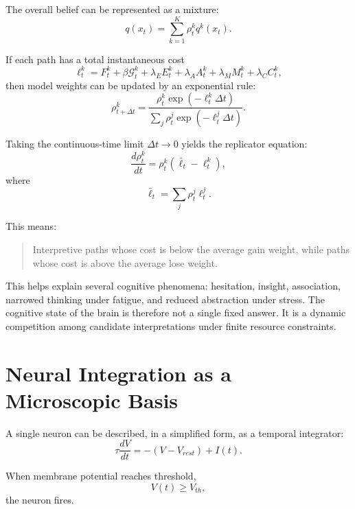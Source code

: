 \documentclass[11pt, a4paper]{article}
\begin{document}
The overall belief can be represented as a mixture:
\begin{equation}
q(x_t)
=
\sum_{k=1}^{K}
\rho_t^k q^k(x_t).
\end{equation}

If each path has a total instantaneous cost
\begin{equation}
\ell_t^k
=
F_t^k
+
\beta \mathcal{G}_t^k
+
\lambda_E E_t^k
+
\lambda_A A_t^k
+
\lambda_M M_t^k
+
\lambda_C C_t^k,
\end{equation}
then model weights can be updated by an exponential rule:
\begin{equation}
\rho_{t+\Delta t}^k
=
\frac{
\rho_t^k
\exp(-\ell_t^k \Delta t)
}{
\sum_j
\rho_t^j
\exp(-\ell_t^j \Delta t)
}.
\end{equation}

Taking the continuous-time limit $\Delta t \to 0$ yields the replicator equation:
\begin{equation}
\frac{d\rho_t^k}{dt}
=
\rho_t^k
(
\bar{\ell}_t
-
\ell_t^k
),
\end{equation}
where
\begin{equation}
\bar{\ell}_t
=
\sum_j \rho_t^j \ell_t^j.
\end{equation}

This means:
\begin{quote}
Interpretive paths whose cost is below the average gain weight, while paths whose cost is above the average lose weight.
\end{quote}

This helps explain several cognitive phenomena: hesitation, insight, association, narrowed thinking under fatigue, and reduced abstraction under stress. The cognitive state of the brain is therefore not a single fixed answer. It is a dynamic competition among candidate interpretations under finite resource constraints.

\section{Neural Integration as a Microscopic Basis}

A single neuron can be described, in a simplified form, as a temporal integrator:
\begin{equation}
\tau \frac{dV}{dt}
=
-(V - V_{rest}) + I(t).
\end{equation}

When membrane potential reaches threshold,
\begin{equation}
V(t)\ge V_{th},
\end{equation}
the neuron fires.
\end{document}
